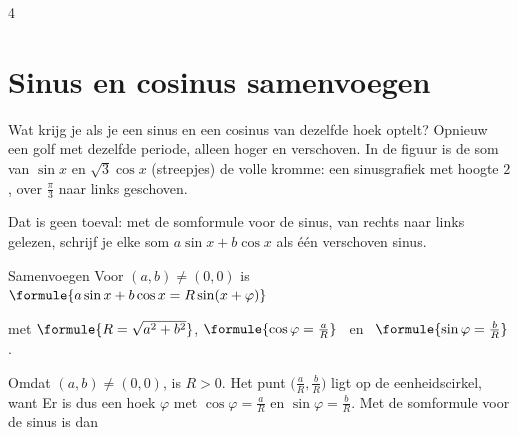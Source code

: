 \begin{alleenvoor}{4}
\section{Sinus en cosinus samenvoegen}

Wat krijg je als je een sinus en een cosinus van dezelfde hoek optelt? Opnieuw een golf met dezelfde periode, alleen hoger en verschoven. In de figuur is de som van $\sin x$ en $\sqrt3\cos x$ (streepjes) de volle kromme: een sinusgrafiek met hoogte $2$, over $\frac{\pi}{3}$ naar links geschoven.


Dat is geen toeval: met de somformule voor de sinus, van rechts naar links gelezen, schrijf je elke som $a\sin x + b\cos x$ als één verschoven sinus.

\begin{theorie}
\begin{stelling}{Samenvoegen}
Voor $(a, b) \neq (0, 0)$ is \quad $\formule{a\sin x + b\cos x = R\sin(x + \varphi)}$

\vspace{1mm}
met \quad $\formule{R = \sqrt{a^2 + b^2}}$, \quad $\formule{\cos\varphi = \frac{a}{R}}$ \ en \ $\formule{\sin\varphi = \frac{b}{R}}$.
\end{stelling}
\begin{bewijs}
Omdat $(a, b) \neq (0, 0)$, is $R > 0$. Het punt $\bigl(\frac{a}{R}, \frac{b}{R}\bigr)$ ligt op de eenheidscirkel, want
Er is dus een hoek $\varphi$ met $\cos\varphi = \frac{a}{R}$ en $\sin\varphi = \frac{b}{R}$. Met de somformule voor de sinus is dan
\end{bewijs}
\end{theorie}


\end{alleenvoor}
